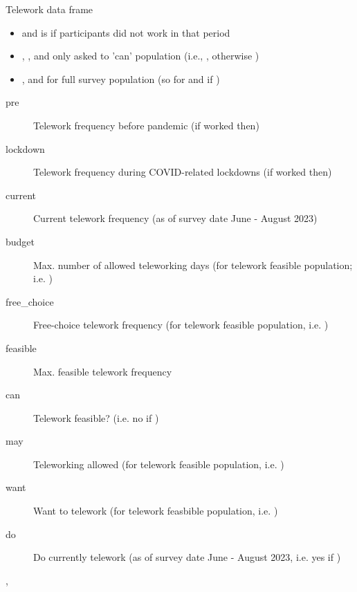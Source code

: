 \begin{Section}{Telework data frame}

\begin{itemize}

\item{}  and  is  if participants did not work in that period
\item{} , ,  and  only asked to 'can' population (i.e., , otherwise )
\item{} ,  and  for full survey population (so  for  and  if )

\end{itemize}


\begin{description}

\item[pre] Telework frequency before pandemic (if worked then)
\item[lockdown] Telework frequency during COVID-related lockdowns (if worked then)
\item[current] Current telework frequency (as of survey date June - August 2023)
\item[budget] Max. number of allowed teleworking days (for telework feasible population; i.e. )
\item[free\_choice] Free-choice telework frequency (for telework feasible population, i.e. )
\item[feasible] Max. feasible telework frequency
\item[can] Telework feasible? (i.e. no if )
\item[may] Teleworking allowed (for telework feasible population, i.e. )
\item[want] Want to telework (for telework feasbible population, i.e. )
\item[do] Do currently telework (as of survey date June - August 2023, i.e. yes if )

\end{description}

\end{Section}
%
\begin{References}
\end{References}
%
\begin{SeeAlso}
, 
\end{SeeAlso}
%
\begin{Examples}
\end{Examples}

